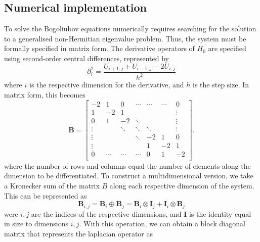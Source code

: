 \subsection{Numerical implementation}
To solve the Bogoliubov equations numerically requires searching for the solution to a generalised non-Hermitian eigenvalue problem. Thus, the system must be formally specified in matrix form. The derivative operators of $H_0$ are specified using second-order central differences, represented by
\begin{equation}
    \partial^2_i = \frac{U_{i+1,j} + U_{i-1,j} - 2U_{i,j}}{h^2}
\end{equation}
where $i$ is the respective dimension for the derivative, and $h$ is the step size. In matrix form, this becomes
\begin{equation}
    \mathbf{B} =
    \begin{bmatrix}
            -2      &   1    &    0   &  \cdots   &  \cdots   &  \cdots   & 0 \\
            1       &   -2   &    1   &           &           &     &  \vdots \\
            0       &    1   &   -2   & \ddots    &           &     &  \vdots \\
            \vdots  &        & \ddots & \ddots    & {\ddots}  &     &  \vdots \\
            \vdots  &        &        & \ddots    &    -2     &  1  &       0 \\
            \vdots  &        &        &           &     1     & -2  &       1 \\
            0       & \cdots & \cdots & \cdots    &     0     &  1  &      -2 \\
        \end{bmatrix}.
\end{equation}
where the number of rows and columns equal the number of elements along the dimension to be differentiated. To construct a multidimensional version, we take a Kronecker sum of the matrix $B$ along each respective dimension of the system. This can be represented as
\begin{equation}
    \mathbf{B}_{i,j} = \mathbf{B}_i \oplus \mathbf{B}_j = \mathbf{B}_i \otimes \mathbf{I}_j + \mathbf{I}_i \otimes \mathbf{B}_j
\end{equation}
were $i,j$ are the indices of the respective dimensions, and $\mathbf{I}$ is the identity equal in size to dimensions $i,j$. With this operation, we can obtain a block diagonal matrix that represents the laplacian operator as

